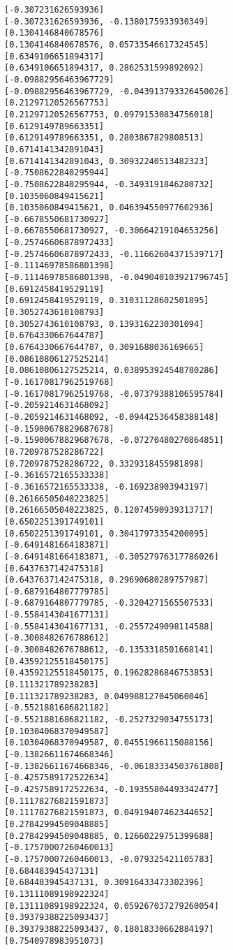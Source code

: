 \documentclass[11pt]{article}
\begin{document}
\begin{Verbatim}[commandchars=\\\{\}]
[-0.307231626593936]
[-0.307231626593936, -0.1380175933930349]
[0.1304146840678576]
[0.1304146840678576, 0.05733546617324545]
[0.6349106651894317]
[0.6349106651894317, 0.2862531599892092]
[-0.09882956463967729]
[-0.09882956463967729, -0.043913793326450026]
[0.21297120526567753]
[0.21297120526567753, 0.09791530834756018]
[0.6129149789663351]
[0.6129149789663351, 0.2803867829808513]
[0.6714141342891043]
[0.6714141342891043, 0.30932240513482323]
[-0.7508622840295944]
[-0.7508622840295944, -0.3493191846280732]
[0.1035060849415621]
[0.1035060849415621, 0.046394550977602936]
[-0.6678550681730927]
[-0.6678550681730927, -0.30664219104653256]
[-0.25746606878972433]
[-0.25746606878972433, -0.11662604371539717]
[-0.11146978586801398]
[-0.11146978586801398, -0.049040103921796745]
[0.6912458419529119]
[0.6912458419529119, 0.31031128602501895]
[0.3052743610108793]
[0.3052743610108793, 0.1393162230301094]
[0.6764330667644787]
[0.6764330667644787, 0.3091688036169665]
[0.08610806127525214]
[0.08610806127525214, 0.038953924548780286]
[-0.16170817962519768]
[-0.16170817962519768, -0.07379388106595784]
[-0.2059214631468092]
[-0.2059214631468092, -0.09442536458388148]
[-0.15900678829687678]
[-0.15900678829687678, -0.07270480270864851]
[0.7209787528286722]
[0.7209787528286722, 0.3329318455981898]
[-0.3616572165533338]
[-0.3616572165533338, -0.169238903943197]
[0.26166505040223825]
[0.26166505040223825, 0.12074590939313717]
[0.6502251391749101]
[0.6502251391749101, 0.30417973354200095]
[-0.6491481664183871]
[-0.6491481664183871, -0.30527976317786026]
[0.6437637142475318]
[0.6437637142475318, 0.29690680289757987]
[-0.6879164807779785]
[-0.6879164807779785, -0.3204271565507533]
[-0.5584143041677131]
[-0.5584143041677131, -0.2557249098114588]
[-0.3008482676788612]
[-0.3008482676788612, -0.1353318501668141]
[0.43592125518450175]
[0.43592125518450175, 0.19628286846753853]
[0.111321789238283]
[0.111321789238283, 0.049988127045060046]
[-0.5521881686821182]
[-0.5521881686821182, -0.2527329034755173]
[0.10304068370949587]
[0.10304068370949587, 0.04551966115088156]
[-0.13826611674668346]
[-0.13826611674668346, -0.06183334503761808]
[-0.4257589172522634]
[-0.4257589172522634, -0.19355804493342477]
[0.11178276821591873]
[0.11178276821591873, 0.04919407462344652]
[0.27842994509048885]
[0.27842994509048885, 0.12660229751399688]
[-0.17570007260460013]
[-0.17570007260460013, -0.079325421105783]
[0.684483945437131]
[0.684483945437131, 0.30916433473302396]
[0.13111089198922324]
[0.13111089198922324, 0.059267037279260054]
[0.39379388225093437]
[0.39379388225093437, 0.18018330662884197]
[0.7540978983951073]

\end{Verbatim}
\end{document}
